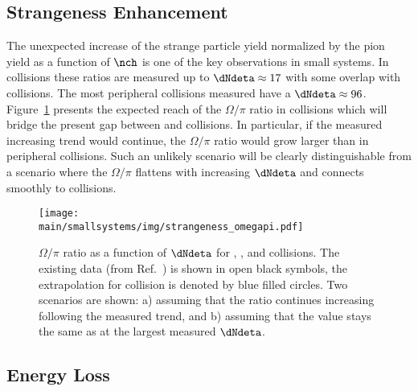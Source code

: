 \documentclass[../report.tex]{subfiles}
\providecommand{\main}{..}
\begin{document}
\subsection{Strangeness Enhancement}
\label{sect:smallsystems_strangeness}

The unexpected increase of the strange particle yield normalized by the pion yield as a function of $\nch$ is one of the key observations in small systems. In \pp collisions these ratios are measured up to $\dNdeta \approx 17$ with some overlap with \pPb collisions. The most peripheral \PbPb collisions measured have a $\dNdeta \approx 96$. Figure~\ref{fig:smallsystems_strangeness_omega_pi} presents the expected reach of the $\Omega/\pi$ ratio in \pp collisions which will bridge the present gap between \pp and \PbPb collisions. In particular, if the measured increasing trend would continue, the $\Omega/\pi$ ratio would grow larger than in peripheral \PbPb collisions. Such an unlikely scenario will be clearly distinguishable from a scenario where the $\Omega/\pi$ flattens with increasing $\dNdeta$ and connects smoothly to \PbPb collisions.

\begin{figure}[ht]
\centering
\texttt{[image: \\main/smallsystems/img/strangeness\_omegapi.pdf]}

\caption{$\Omega/\pi$ ratio as a function of $\dNdeta$ for \pp, \pPb, and \PbPb collisions. The existing data (from Ref.~\cite{ALICE:2017jyt}) is shown in open black symbols, the extrapolation for \pp collision is denoted by blue filled circles. Two scenarios are shown: a) assuming that the ratio continues increasing following the measured trend, and b) assuming that the value stays the same as at the largest measured $\dNdeta$.}
\label{fig:smallsystems_strangeness_omega_pi}
\end{figure}

\subsection{Energy Loss}
\label{sect:smallsystems_energyloss}

\end{document}
